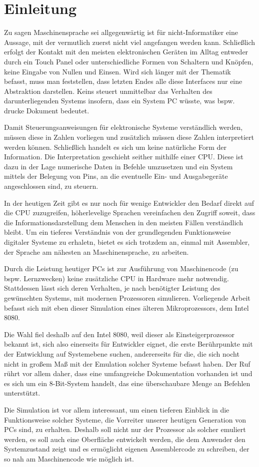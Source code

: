 \chapter{Einleitung}

Zu sagen Maschinensprache sei allgegenwärtig ist für nicht-Informatiker eine Aussage, mit der vermutlich zuerst nicht viel angefangen werden kann. Schließlich erfolgt der Kontakt mit den meisten elektronischen Geräten im Alltag entweder durch ein Touch Panel oder unterschiedliche Formen von Schaltern und Knöpfen, keine Eingabe von Nullen und Einsen. Wird sich länger mit der Thematik befasst, muss man feststellen, dass letzten Endes alle diese Interfaces nur eine Abstraktion darstellen. Keins steuert unmittelbar das Verhalten des darunterliegenden Systems insofern, dass ein System PC wüsste, was bspw. \glqq drucke Dokument\grqq{} bedeutet.

Damit Steuerungsanweisungen für elektronische Systeme verständlich werden, müssen diese in Zahlen vorliegen und zusätzlich müssen diese Zahlen interpretiert werden können. Schließlich handelt es sich um keine natürliche Form der Information. Die Interpretation geschieht seither mithilfe einer \ac{CPU}. Diese ist dazu in der Lage numerische Daten in Befehle umzusetzen und ein System mittels der Belegung von Pins, an die eventuelle Ein- und Ausgabegeräte angeschlossen sind, zu steuern.

In der heutigen Zeit gibt es nur noch für wenige Entwickler den Bedarf direkt auf die \ac{CPU} zuzugreifen, höherlevelige Sprachen vereinfachen den Zugriff soweit, dass die Informationsdarstellung dem Menschen in den meisten Fällen verständlich bleibt. Um ein tieferes Verständnis von der grundlegenden Funktionsweise digitaler Systeme zu erhaletn, bietet es sich trotzdem an, einmal mit Assembler, der Sprache am nähesten an Maschinensprache, zu arbeiten.
\medskip

Durch die Leistung heutiger PCs ist zur Ausführung von Maschinencode (zu bspw. Lernzwecken) keine zusätzliche \ac{CPU} in Hardware mehr notwendig. Stattdessen lässt sich deren Verhalten, je nach benötigter Leistung des gewünschten Systems, mit modernen Prozessoren simulieren. Vorliegende Arbeit befasst sich mit eben dieser Simulation eines älteren Mikroprozessors, dem Intel 8080.

Die Wahl fiel deshalb auf den Intel 8080, weil dieser als \glqq Einsteigerprozessor\grqq{} bekannt ist, sich also einerseits für Entwickler eignet, die erste Berührpunkte mit der Entwicklung auf Systemebene suchen, andererseits für die, die sich nocht nicht in großem Maß mit der Emulation solcher Systeme befasst haben. Der Ruf rührt vor allem daher, dass eine umfangreiche Dokumentation vorhanden ist und es sich um ein 8-Bit-System handelt, das eine überschaubare Menge an Befehlen unterstützt.

Die Simulation ist vor allem interessant, um einen tieferen Einblick in die Funktionsweise solcher Systeme, die Vorreiter unserer heutigen Generation von PCs sind, zu erhalten. Deshalb soll nicht nur der Prozessor als solcher emuliert werden, es soll auch eine Oberfläche entwickelt werden, die dem Anwender den Systemzustand zeigt und es ermöglicht eigenen Assemblercode zu schreiben, der so nah am Maschinencode wie möglich ist.
